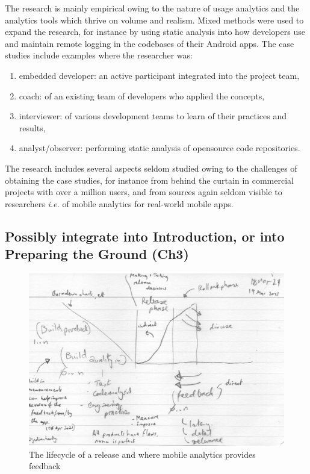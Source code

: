 The research is mainly empirical owing to the nature of usage analytics and the analytics tools which thrive on volume and realism. Mixed methods were used to expand the research, for instance by using static analysis into how developers use and maintain remote logging in the codebases of their Android apps. The case studies include examples where the researcher was:
\begin{enumerate}
    \item embedded developer: an active participant integrated into the project team,
    \item coach: of an existing team of developers who applied the concepts,
    \item interviewer: of various development teams to learn of their practices and results,
    \item analyst/observer: performing static analysis of opensource code repositories.
\end{enumerate}

The research includes several aspects seldom studied owing to the challenges of obtaining the case studies, for instance from behind the curtain in commercial projects with over a million users, and from sources again seldom visible to researchers \emph{i.e.} of mobile analytics for real-world mobile apps.

\clearpage

\subsection{Possibly integrate into Introduction, or into Preparing the Ground (Ch3)}
\begin{figure}
    \centering
    \includegraphics[width=15cm]{images/rough-sketches/Red-Thread-Rough-Sketch.jpeg}
    \caption{The lifecycle of a release and where mobile analytics provides feedback}
    \label{fig:red-thread-for-this-thesis}
\end{figure}

